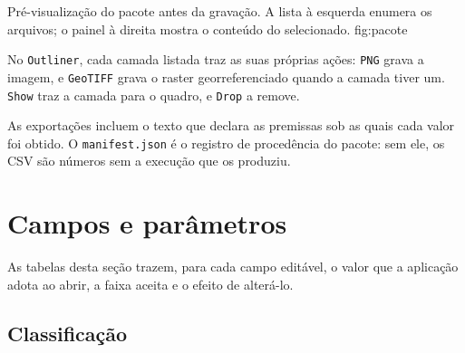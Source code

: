 \documentclass[12pt,a4paper]{article}
\begin{document}
  {Pr\'e-visualiza\c{c}\~ao do pacote antes da grava\c{c}\~ao. A lista \`a
   esquerda enumera os arquivos; o painel \`a direita mostra o conte\'udo do
   selecionado.}
  {fig:pacote}

 No \texttt{Outliner}, cada camada
listada traz as suas pr\'oprias a\c{c}\~oes: \texttt{PNG} grava a
imagem, e \texttt{GeoTIFF} grava o raster georreferenciado quando a camada
tiver um. \texttt{Show} traz a camada para o quadro, e \texttt{Drop} a remove.

\begin{achado}
As exporta\c{c}\~oes incluem o texto que declara as premissas sob as quais cada
valor foi obtido. O \texttt{manifest.json} \'e o registro de proced\^encia do
pacote: sem ele, os CSV s\~ao n\'umeros sem a execu\c{c}\~ao que os produziu.
\end{achado}

%
%
\appendix

\section{Campos e par\^ametros}

As tabelas desta se\c{c}\~ao trazem, para cada campo edit\'avel, o valor que a
aplica\c{c}\~ao adota ao abrir, a faixa aceita e o efeito de alter\'a-lo.

\subsection{Classifica\c{c}\~ao}
\end{document}
